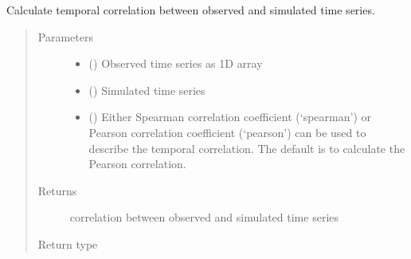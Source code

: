 \documentclass[letterpaper,10pt,english]{sphinxmanual}
\begin{document}
\begin{fulllineitems}
\label{\detokenize{reference/de:de.de.calc_temp_cor}}
Calculate temporal correlation between observed and simulated
time series.
\begin{quote}\begin{description}
\item[{Parameters}] \leavevmode\begin{itemize}
\item {} 
 (\sphinxstyleliteralemphasis{\sphinxupquote{(}}\sphinxstyleliteralemphasis{\sphinxupquote{,}}\sphinxstyleliteralemphasis{\sphinxupquote{)}}) \textendash{} Observed time series as 1\sphinxhyphen{}D array

\item {} 
 (\sphinxstyleliteralemphasis{\sphinxupquote{(}}\sphinxstyleliteralemphasis{\sphinxupquote{,}}\sphinxstyleliteralemphasis{\sphinxupquote{)}}) \textendash{} Simulated time series

\item {} 
 (\sphinxstyleliteralemphasis{\sphinxupquote{, }}) \textendash{} Either Spearman correlation coefficient (‘spearman’) or Pearson
correlation coefficient (‘pearson’) can be used to describe the temporal
correlation. The default is to calculate the Pearson correlation.

\end{itemize}

\item[{Returns}] \leavevmode
{} \textendash{} correlation between observed and simulated time series

\item[{Return type}] \leavevmode
{}

\end{description}\end{quote}

\end{fulllineitems}
\end{document}
